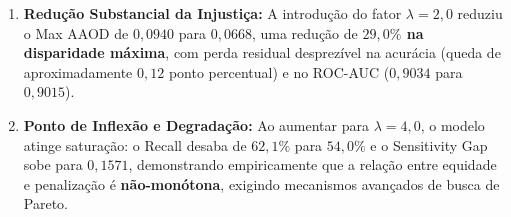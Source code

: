 \begin{table}[H]
    \centering
    \caption{Adult: Efeito da penalização de viés na FairMLP (lambda sweep).}
    \vspace{2mm}
    \label{tab:adult_lambda_sweep}
\end{table}

\begin{enumerate}
    \item \textbf{Redução Substancial da Injustiça:} A introdução do fator $\lambda = 2,0$ reduziu o Max AAOD de $0,0940$ para $0,0668$, uma redução de \textbf{$29,0\%$ na disparidade máxima}, com perda residual desprezível na acurácia (queda de aproximadamente $0,12$ ponto percentual) e no ROC-AUC ($0,9034$ para $0,9015$).
    \item \textbf{Ponto de Inflexão e Degradação:} Ao aumentar para $\lambda = 4,0$, o modelo atinge saturação: o Recall desaba de $62,1\%$ para $54,0\%$ e o Sensitivity Gap sobe para $0,1571$, demonstrando empiricamente que a relação entre equidade e penalização é \textbf{não-monótona}, exigindo mecanismos avançados de busca de Pareto.
\end{enumerate}


